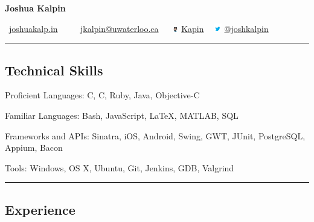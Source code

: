 \documentclass[10pt,letterpaper]{article}
\newenvironment{indentsection}[1]%
{\begin{list}{}%
	{\setlength{\leftmargin}{#1}}%
	\item[]%
}
{\end{list}}
\newcommand{\CPP}
{C\nolinebreak[4]\hspace{-.05em}\raisebox{.22ex}{\footnotesize\bf ++}}
\begin{document}
\begin{center}
{\LARGE \textbf{Joshua Kalpin}}
\vspace{0.1cm}

\Mundus \ \href{http://joshuakalp.in}{joshuakalp.in} \ \textbullet
\ \ \Letter \ \href{mailto:jkalpin@uwaterloo.ca}{jkalpin@uwaterloo.ca} \ \textbullet
\ \includegraphics[height=6pt]{Resources/Octocat} 
\href{https://github.com/kapin}{Kapin} \ \textbullet
 \includegraphics[height=10pt]{Resources/twitter}
\href{https://twitter.com/joshkalpin}{@joshkalpin}
\end{center}

\hrule
\vspace{-0.4em}
\subsection*{Technical Skills}

\begin{indentsection}{\parindent}
\begin{description*}
	\item[Proficient Languages:]
	C, \CPP, Ruby, Java, Objective-C
	\item[Familiar Languages:]
	Bash, JavaScript, \LaTeX, MATLAB, SQL
	\item[Frameworks and APIs:]
	Sinatra, iOS, Android, Swing, GWT, JUnit, PostgreSQL, Appium, Bacon
	\item[Tools:]
	Windows, OS X, Ubuntu, Git, Jenkins, GDB, Valgrind
\end{description*}
\end{indentsection}

\hrule
\vspace{-0.4em}
\subsection*{Experience}
\end{document}
